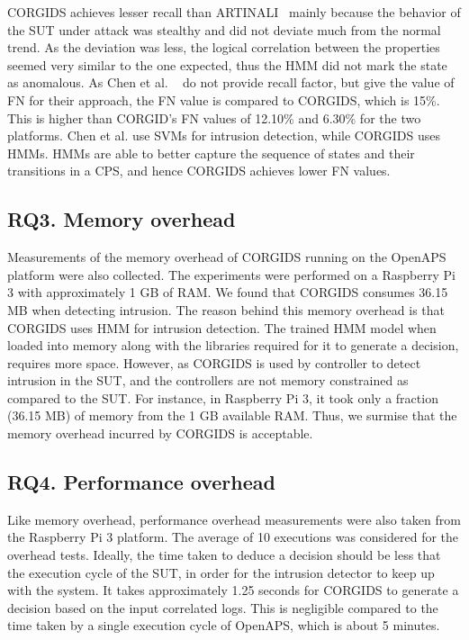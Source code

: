  
CORGIDS achieves lesser recall than ARTINALI~\cite{aliabadi2017artinali} mainly because the behavior of the SUT under attack was stealthy and did not deviate much from the normal trend. As the deviation was less, the logical correlation between the properties seemed very similar to the one expected, thus the HMM did not mark the state as anomalous. As Chen et al. ~\cite{chen2018learning} do not provide recall factor, but give the value of FN for their approach, the FN value is compared to CORGIDS, which is 15\%. This is higher than CORGID's FN values of 12.10\% and 6.30\% for the two platforms. Chen et al. use SVMs for intrusion detection, while CORGIDS uses HMMs. HMMs are able to better capture the sequence of states and their transitions in a CPS, and hence CORGIDS achieves lower FN values.

\subsection{RQ3. Memory overhead}
Measurements of the memory overhead of CORGIDS running on the OpenAPS platform were also collected. The experiments were performed on a Raspberry Pi 3 with approximately 1 GB of RAM. We found that CORGIDS consumes 36.15 MB when detecting intrusion. The reason behind this memory overhead is that CORGIDS uses HMM for intrusion detection. The trained HMM model when loaded into memory along with the libraries required for it to generate a decision, requires more space. However, as CORGIDS is used by controller to detect intrusion in the SUT, and the controllers are not memory constrained as compared to the SUT. For instance, in Raspberry Pi 3, it took only a fraction (36.15 MB) of memory from the 1 GB available RAM. Thus, we surmise that the memory overhead incurred by CORGIDS is acceptable.

\subsection{RQ4. Performance overhead}
Like memory overhead, performance overhead measurements were also taken from the Raspberry Pi 3 platform. The average of 10 executions was considered for the overhead tests.  
Ideally, the time taken to deduce a decision should be less that the execution cycle of the SUT, in order for the intrusion detector to keep up with the system. It takes approximately 1.25 seconds for CORGIDS to generate a decision based on the input correlated logs. This is negligible compared to the time taken by a single execution cycle of OpenAPS, which is about 5 minutes.

